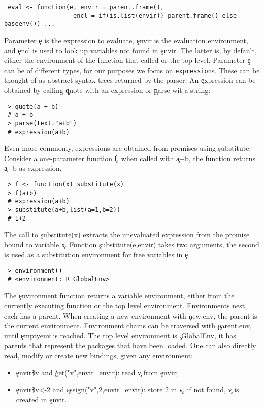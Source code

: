\documentclass[screen,acmsmall]{acmart}
\begin{document}
\begin{lstlisting}
 eval <- function(e, envir = parent.frame(),
                   encl = if(is.list(envir)) parent.frame() else baseenv()) ...
\end{lstlisting}
Parameter \c e is the expression to evaluate, \c{envir} is the evaluation
environment, and \c{encl} is used to look up variables not found in \c{envir}.
The latter is, by default, either the environment of the function that called
\eval or the top level. Parameter \c e can be of different types, for our
purposes we focus on {\tt expression}s. These can be thought of as abstract
syntax trees returned by the parser. An \c{expression} can be obtained by
calling \c{quote} with an expression or \c{parse} wit a string:
\begin{lstlisting}
 > quote(a + b)
 # a + b
 > parse(text="a+b")
 # expression(a+b)
\end{lstlisting}
Even more commonly, expressions are obtained from promises using \c{substitute}.
Consider a one-parameter function \c{f}, when called with \c{a+b}, the function
returns \c{a+b} as expression.
\begin{lstlisting}
 > f <- function(x) substitute(x)
 > f(a+b)
 # expression(a+b)
 > substitute(a+b,list(a=1,b=2))
 # 1+2
\end{lstlisting}
The call to \c{substitute(x)} extracts the unevaluated expression from the
promise bound to variable \c x. Function \c{substitute(e,envir)} takes two
arguments, the second is used as a substitution environment for free variables
in \c e.
\begin{lstlisting}
 > environment()
 # <environment: R_GlobalEnv>
\end{lstlisting}
The \c{environment} function returns a variable environment, either from the
currently executing function or the top level environment. Environments nest,
each has a parent. When creating a new environment with \c{new.env}, the parent
is the current environment. Environment chains can be traversed with
\c{parent.env}, until \c{emptyenv} is reached. The top level environment is
\c{.GlobalEnv}, it has parents that represent the packages that have been
loaded. One can also directly read, modify or create new bindings, given any
environment:
\begin{itemize}
\item \c{envir\$v} and \c{get("v",envir=envir)}: read  \c{v} from \c{envir};
\item \c{envir\$v<-2} and \c{assign("v",2,envir=envir)}: store 2 in \c{v}, if
  not found, \c{v} is created in \c{envir}.
\end{itemize}
\end{document}
